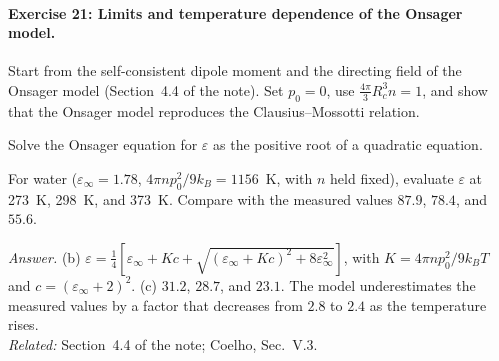 \documentclass[11pt]{article}      %
\numberwithin{equation}{section}   %
\begin{document}
\paragraph{Exercise 21: Limits and temperature dependence of the Onsager model.}
\begin{parts}
    \item Start from the self-consistent dipole moment and the directing field of the Onsager model (Section~4.4 of the note). Set $p_0 = 0$, use $\tfrac{4\pi}{3}R_c^3n = 1$, and show that the Onsager model reproduces the Clausius--Mossotti relation.
    \item Solve the Onsager equation for $\varepsilon$ as the positive root of a quadratic equation.
    \item For water ($\varepsilon_\infty = 1.78$, $4\pi np_0^2/9k_B = 1156$~K, with $n$ held fixed), evaluate $\varepsilon$ at 273~K, 298~K, and 373~K. Compare with the measured values $87.9$, $78.4$, and $55.6$.
\end{parts}
\textit{Answer.} (b) $\varepsilon = \tfrac14\left[\varepsilon_\infty + Kc + \sqrt{(\varepsilon_\infty + Kc)^2 + 8\varepsilon_\infty^2}\right]$, with $K = 4\pi np_0^2/9k_BT$ and $c = (\varepsilon_\infty + 2)^2$. (c) $31.2$, $28.7$, and $23.1$. The model underestimates the measured values by a factor that decreases from $2.8$ to $2.4$ as the temperature rises.\\
\textit{Related:} Section~4.4 of the note; Coelho, Sec.~V.3.
\end{document}
